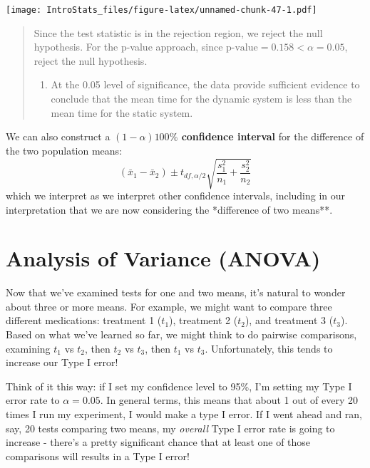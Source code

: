 \documentclass[
]{book}
\providecommand{\tightlist}{%
  \setlength{\itemsep}{0pt}\setlength{\parskip}{0pt}}
\begin{document}
\texttt{[image: IntroStats\_files/figure-latex/unnamed-chunk-47-1.pdf]}

\begin{quote}
Since the test statistic is in the rejection region, we reject the null hypothesis. For the p-value approach, since \(\text{p-value}=0.158 < \alpha =0.05\), reject the null hypothesis.

\begin{enumerate}
\def\labelenumi{\arabic{enumi}.}
\setcounter{enumi}{5}
\tightlist
\item
  At the 0.05 level of significance, the data provide sufficient evidence to conclude that the mean time for the dynamic system is less than the mean time for the static system.
\end{enumerate}
\end{quote}

We can also construct a \textbf{\((1-\alpha)100\%\) confidence interval} for the difference of the two population means: \[(\bar{x}_1-\bar{x}_2) \pm t_{df, \alpha/2}\sqrt{\frac{s_1^2}{n_1} + \frac{s_2^2}{n_2}}\] which we interpret as we interpret other confidence intervals, including in our interpretation that we are now considering the *difference of two means**.

\hypertarget{analysis-of-variance-anova}{%
\section{Analysis of Variance (ANOVA)}\label{analysis-of-variance-anova}}

Now that we've examined tests for one and two means, it's natural to wonder about three or more means. For example, we might want to compare three different medications: treatment 1 (\(t_1\)), treatment 2 (\(t_2\)), and treatment 3 (\(t_3\)). Based on what we've learned so far, we might think to do pairwise comparisons, examining \(t_1\) vs \(t_2\), then \(t_2\) vs \(t_3\), then \(t_1\) vs \(t_3\). Unfortunately, this tends to increase our Type I error!

Think of it this way: if I set my confidence level to 95\%, I'm setting my Type I error rate to \(\alpha=0.05\). In general terms, this means that about 1 out of every 20 times I run my experiment, I would make a type I error. If I went ahead and ran, say, 20 tests comparing two means, my \emph{overall} Type I error rate is going to increase - there's a pretty significant chance that at least one of those comparisons will results in a Type I error!
\end{document}
